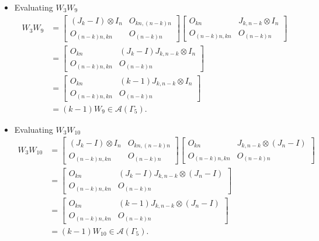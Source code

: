 \begin{itemize}
\item Evaluating $W_{3}W_{9}$
\begin{align*}
W_3W_9 &=
\begin{bmatrix}
(J_k - I) \otimes I_n & O_{kn, (n-k)n} \\
O_{(n-k)n,kn} & O_{(n-k)n}
\end{bmatrix}
\begin{bmatrix}
O_{kn} & J_{k,n-k} \otimes I_n \\
O_{(n-k)n,kn} & O_{(n-k)n}
\end{bmatrix}\\
&= \begin{bmatrix}
O_{kn} & (J_k - I)J_{k,n-k} \otimes I_n \\
O_{(n-k)n,kn} & O_{(n-k)n}
\end{bmatrix}\\
&= \begin{bmatrix}
O_{kn} & (k-1)J_{k,n-k} \otimes I_n \\
O_{(n-k)n,kn} & O_{(n-k)n}
\end{bmatrix}\\
&= (k-1)W_{9}\in\mathcal{A}(\Gamma_5).
\end{align*}

\item Evaluating $W_{3}W_{10}$
\begin{align*}
W_3W_{10} &=
\begin{bmatrix}
(J_k - I) \otimes I_n & O_{kn, (n-k)n} \\
O_{(n-k)n,kn} & O_{(n-k)n}
\end{bmatrix}
\begin{bmatrix}
O_{kn} & J_{k,n-k} \otimes (J_n-I) \\
O_{(n-k)n,kn} & O_{(n-k)n}
\end{bmatrix}\\
&= \begin{bmatrix}
O_{kn} & (J_k - I)J_{k,n-k} \otimes (J_n-I) \\
O_{(n-k)n,kn} & O_{(n-k)n}
\end{bmatrix}\\
&= \begin{bmatrix}
O_{kn} & (k-1)J_{k,n-k} \otimes (J_n-I) \\
O_{(n-k)n,kn} & O_{(n-k)n}
\end{bmatrix}\\
&= (k-1)W_{10}\in\mathcal{A}(\Gamma_5).
\end{align*}


\end{itemize}
